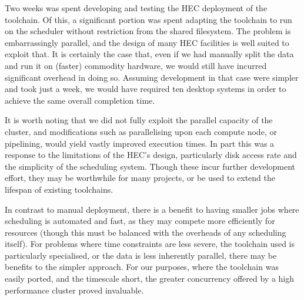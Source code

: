 
Two weeks was spent developing and testing the HEC deployment of the toolchain.  Of this, a significant portion was spent adapting the toolchain to run on the scheduler without restriction from the shared filesystem.
The problem is embarrassingly parallel, and the design of many HEC facilities is well suited to exploit that.  It is certainly the case that, even if we had manually split the data and run it on (faster) commodity hardware, we would still have incurred significant overhead in doing so.  Assuming development in that case were simpler and took just a week, we would have required ten desktop systems in order to achieve the same overall completion time.

It is worth noting that we did not fully exploit the parallel capacity of the cluster, and modifications such as parallelising upon each compute node, or pipelining, would yield vastly improved execution times.  In part this was a response to the limitations of the HEC's design, particularly disk access rate and the simplicity of the scheduling system.
Though these incur further development effort, they may be worthwhile for many projects, or be used to extend the lifespan of existing toolchains.

In contrast to manual deployment, there is a benefit to having smaller jobs where scheduling is automated and fast, as they may compete more efficiently for resources (though this must be balanced with the overheads of any scheduling itself).
For problems where time constraints are less severe, the toolchain used is particularly specialised, or the data is less inherently parallel, there may be benefits to the simpler approach.  For our purposes, where
the toolchain was easily ported, and the timescale short, the greater concurrency offered by a high performance cluster proved invaluable.  

